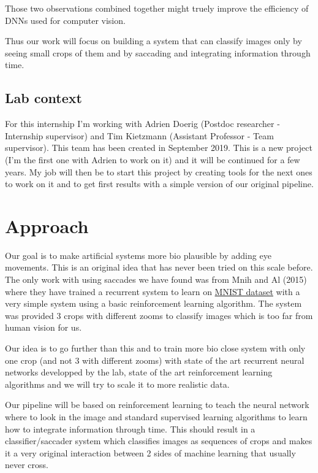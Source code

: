 \documentclass[11pt]{article}
\begin{document}
Those two observations combined together might truely improve the efficiency of DNNs used for computer vision.

Thus our work will focus on building a system that can classify images only by seeing small crops of them and by saccading and integrating information through time.

\subsection{Lab context}
For this internship I'm working with Adrien Doerig (Postdoc researcher - Internship supervisor) and Tim Kietzmann (Assistant Professor - Team supervisor). This team has been created in September 2019.
This is a new project (I'm the first one with Adrien to work on it) and it will be continued for a few years. My job will then be to start this project by creating tools for the next ones to work on it and to get first results with a simple version of our original pipeline.

\section{Approach}
Our goal is to make artificial systems more bio plausible by adding eye movements. This is an original idea that has never been tried on this scale before. The only work with using saccades we have found was from Mnih and Al (2015) where they have trained a recurrent system to learn on \underline{MNIST dataset} with a very simple system using a basic reinforcement learning algorithm. The system was provided 3 crops with different zooms to classify images which is too far from human vision for us.

Our idea is to go further than this and to train more bio close system with only one crop (and not 3 with different zooms) with state of the art recurrent neural networks developped by the lab, state of the art reinforcement learning algorithms and we will try to scale it to more realistic data.

Our pipeline will be based on reinforcement learning to teach the neural network where to look in the image and standard supervised learning algorithms to learn how to integrate information through time. This should result in a classifier/saccader system which classifies images as sequences of crops and makes it a very original interaction between 2 sides of machine learning that usually never cross.
\end{document}
